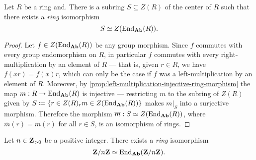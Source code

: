 %
\begin{proposition}
\label{prop:center-ring-iso-center-End(R)}
Let \(R\) be a ring and. There is a subring \(S \subseteq Z(R)\) of the
center of \(R\) such that there exists a \emph{ring} isomorphism
\[
S \simeq Z(\operatorname{End}_{{\textbf{Ab}}}(R)).
\]
\end{proposition}
%

%
\begin{proof}
Let \(f \in Z(\operatorname{End}_{{\textbf{Ab}}}(R))\) be any group morphism. Since \(f\) commutes with
every group endomorphism on \(R\), in particular \(f\) commutes with every
right-multiplication by an element of \(R\) --- that is, given \(r \in R\), we
have \(f(x r) = f(x) r\), which can only be the case if \(f\) was a
left-multiplication by an element of \(R\). Moreover, by
\cref{prop:left-multiplication-injective-ring-morphism} the map
\(m: R \to \operatorname{End}_{{\textbf{Ab}}}(R)\) is injective --- restricting \(m\) to the subring of
\(Z(R)\) given by
\(S \coloneq \{r \in Z(R) \relax {}_rm \in Z(\operatorname{End}_{{\textbf{Ab}}}(R))\}\) makes \(m|_S\)
into a surjective morphism. Therefore the morphism
\(\overline{m}: S \simeq Z(\operatorname{End}_{{\textbf{Ab}}}(R))\), where \(\overline{m}(r) = m(r)\) for
all \(r \in S\), is an isomorphism of rings.
\end{proof}
%

%
\begin{corollary}
\label{cor:Z/nZ-iso-End(Z/nZ)}
Let \(n \in \mathbf{Z}_{> 0}\) be a positive integer. There exists a \emph{ring}
isomorphism
\[
\mathbf{Z}/n\mathbf{Z} \simeq \operatorname{End}_{{\textbf{Ab}}}(\mathbf{Z}/n\mathbf{Z}).
\]
\end{corollary}
%

